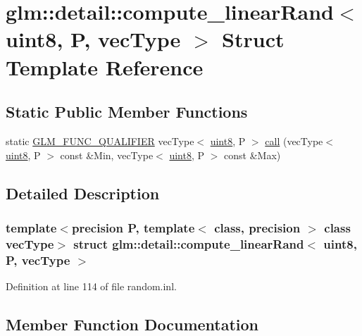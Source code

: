 \hypertarget{structglm_1_1detail_1_1compute__linear_rand_3_01uint8_00_01_p_00_01vec_type_01_4}{}\section{glm\+::detail\+::compute\+\_\+linear\+Rand$<$ uint8, P, vec\+Type $>$ Struct Template Reference}
\label{structglm_1_1detail_1_1compute__linear_rand_3_01uint8_00_01_p_00_01vec_type_01_4}
\subsection*{Static Public Member Functions}
\begin{DoxyCompactItemize}
\item 
static \mbox{\hyperlink{setup_8hpp_a33fdea6f91c5f834105f7415e2a64407}{G\+L\+M\+\_\+\+F\+U\+N\+C\+\_\+\+Q\+U\+A\+L\+I\+F\+I\+ER}} vec\+Type$<$ \mbox{\hyperlink{namespaceglm_1_1detail_aef2588f97d090cc19fbbe0c74fe17c8f}{uint8}}, P $>$ \mbox{\hyperlink{structglm_1_1detail_1_1compute__linear_rand_3_01uint8_00_01_p_00_01vec_type_01_4_aee2b1e5fe6b54c1765ba8051bcd37cfe}{call}} (vec\+Type$<$ \mbox{\hyperlink{namespaceglm_1_1detail_aef2588f97d090cc19fbbe0c74fe17c8f}{uint8}}, P $>$ const \&Min, vec\+Type$<$ \mbox{\hyperlink{namespaceglm_1_1detail_aef2588f97d090cc19fbbe0c74fe17c8f}{uint8}}, P $>$ const \&Max)
\end{DoxyCompactItemize}


\subsection{Detailed Description}
\subsubsection*{template$<$precision P, template$<$ class, precision $>$ class vec\+Type$>$\newline
struct glm\+::detail\+::compute\+\_\+linear\+Rand$<$ uint8, P, vec\+Type $>$}



Definition at line 114 of file random.\+inl.



\subsection{Member Function Documentation}
\mbox{\label{structglm_1_1detail_1_1compute__linear_rand_3_01uint8_00_01_p_00_01vec_type_01_4_aee2b1e5fe6b54c1765ba8051bcd37cfe}} 
